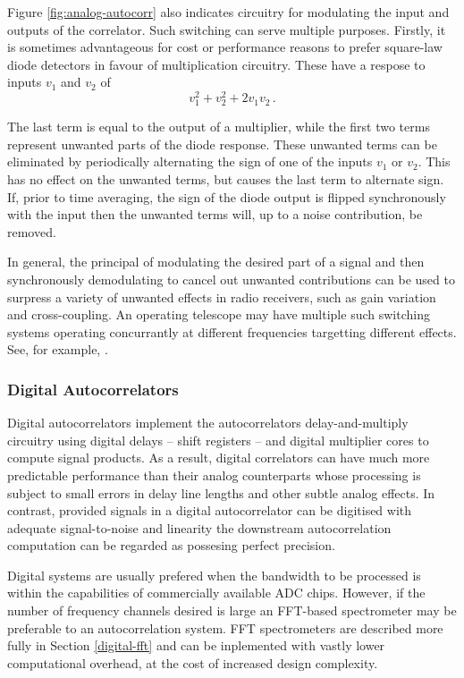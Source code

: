 \documentclass{article}
\begin{document}
Figure \ref{fig:analog-autocorr} also indicates circuitry for modulating the input and outputs of the correlator. Such switching can serve multiple purposes. Firstly, it is sometimes advantageous for cost or performance reasons to prefer square-law diode detectors in favour of multiplication circuitry. These have a respose to inputs $v_1$ and $v_2$ of
\begin{equation}
 v_1^2 + v_2^2 + 2v_1v_2 \, .
\end{equation}

The last term is equal to the output of a multiplier, while the first two terms represent unwanted parts of the diode response. These unwanted terms can be eliminated by periodically alternating the sign of one of the inputs $v_1$ or $v_2$. This has no effect on the unwanted terms, but causes the last term to alternate sign. If, prior to time averaging, the sign of the diode output is flipped synchronously with the input then the unwanted terms will, up to a noise contribution, be removed.

In general, the principal of modulating the desired part of a signal and then synchronously demodulating to cancel out unwanted contributions can be used to surpress a variety of unwanted effects in radio receivers, such as gain variation and cross-coupling. An operating telescope may have multiple such switching systems operating concurrantly at different frequencies targetting different effects. See, for example, \cite{Erickson2007}. 


\subsubsection{Digital Autocorrelators}\label{digital-autocorrelators}
Digital autocorrelators implement the autocorrelators delay-and-multiply circuitry using digital delays -- shift registers -- and digital multiplier cores to compute signal products. As a result, digital correlators can have much more predictable performance than their analog counterparts whose processing is subject to small errors in delay line lengths and other subtle analog effects. In contrast, provided signals in a digital autocorrelator can be digitised with adequate signal-to-noise and linearity the downstream autocorrelation computation can be regarded as possesing perfect precision.

Digital systems are usually prefered when the bandwidth to be processed is within the capabilities of commercially available ADC chips. However, if the number of frequency channels desired is large an FFT-based spectrometer may be preferable to an autocorrelation system. FFT spectrometers are described more fully in Section \ref{digital-fft} and can be inplemented with vastly lower computational overhead, at the cost of increased design complexity.
\end{document}
